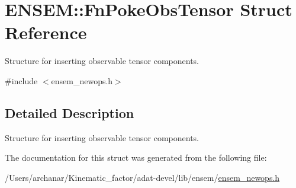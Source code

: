 \hypertarget{structENSEM_1_1FnPokeObsTensor}{}\section{E\+N\+S\+EM\+:\+:Fn\+Poke\+Obs\+Tensor Struct Reference}
\label{structENSEM_1_1FnPokeObsTensor}


Structure for inserting observable tensor components.  




{\ttfamily \#include $<$ensem\+\_\+newops.\+h$>$}



\subsection{Detailed Description}
Structure for inserting observable tensor components. 

The documentation for this struct was generated from the following file\+:\begin{DoxyCompactItemize}
\item 
/\+Users/archanar/\+Kinematic\+\_\+factor/adat-\/devel/lib/ensem/\mbox{\hyperlink{adat-devel_2lib_2ensem_2ensem__newops_8h}{ensem\+\_\+newops.\+h}}\end{DoxyCompactItemize}
